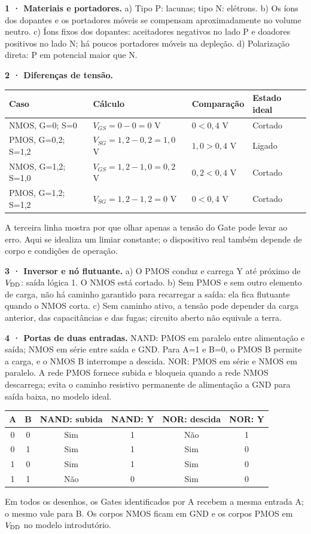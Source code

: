 \documentclass[11pt,a4paper]{article}
\begin{document}
\textbf{1 · Materiais e portadores.} a) Tipo P: lacunas; tipo N: elétrons. b) Os íons dos dopantes e os portadores móveis se compensam aproximadamente no volume neutro. c) Íons fixos dos dopantes: aceitadores negativos no lado P e doadores positivos no lado N; há poucos portadores móveis na depleção. d) Polarização direta: P em potencial maior que N.

\textbf{2 · Diferenças de tensão.}
\begin{center}\begin{tabular}{llll}\toprule Caso & Cálculo & Comparação & Estado ideal\\\midrule
NMOS, G=0; S=0 & $V_{GS}=0-0=0$ V & $0<0{,}4$ V & Cortado\\
PMOS, G=0,2; S=1,2 & $V_{SG}=1{,}2-0{,}2=1{,}0$ V & $1{,}0>0{,}4$ V & Ligado\\
NMOS, G=1,2; S=1,0 & $V_{GS}=1{,}2-1{,}0=0{,}2$ V & $0{,}2<0{,}4$ V & Cortado\\
PMOS, G=1,2; S=1,2 & $V_{SG}=1{,}2-1{,}2=0$ V & $0<0{,}4$ V & Cortado\\\bottomrule\end{tabular}\end{center}
A terceira linha mostra por que olhar apenas a tensão do Gate pode levar ao erro. Aqui se idealiza um limiar constante; o dispositivo real também depende de corpo e condições de operação.

\textbf{3 · Inversor e nó flutuante.} a) O PMOS conduz e carrega Y até próximo de $V_{\mathrm{DD}}$: saída lógica 1. O NMOS está cortado. b) Sem PMOS e sem outro elemento de carga, não há caminho garantido para recarregar a saída: ela fica flutuante quando o NMOS corta. c) Sem caminho ativo, a tensão pode depender da carga anterior, das capacitâncias e das fugas; circuito aberto não equivale a terra.

\textbf{4 · Portas de duas entradas.} NAND: PMOS em paralelo entre alimentação e saída; NMOS em série entre saída e GND. Para A=1 e B=0, o PMOS B permite a carga, e o NMOS B interrompe a descida. NOR: PMOS em série e NMOS em paralelo. A rede PMOS fornece subida e bloqueia quando a rede NMOS descarrega; evita o caminho resistivo permanente de alimentação a GND para saída baixa, no modelo ideal.
\begin{center}\begin{tabular}{cccccc}\toprule A & B & NAND: subida & NAND: Y & NOR: descida & NOR: Y\\\midrule
0&0&Sim&1&Não&1\\0&1&Sim&1&Sim&0\\1&0&Sim&1&Sim&0\\1&1&Não&0&Sim&0\\\bottomrule\end{tabular}\end{center}
Em todos os desenhos, os Gates identificados por A recebem a mesma entrada A; o mesmo vale para B. Os corpos NMOS ficam em GND e os corpos PMOS em $V_{\mathrm{DD}}$ no modelo introdutório.
\end{document}
